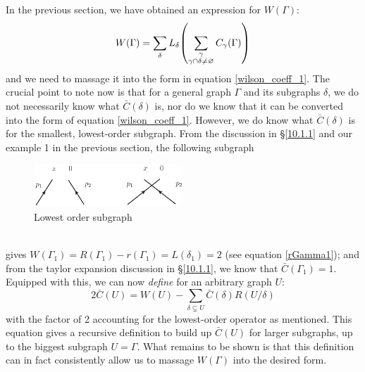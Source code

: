 \documentclass{article}
\begin{document}
In the previous section, we have obtained an expression for $W(\Gamma)$:
\begin{equation}
    W(\Gamma) = \sum_\delta L_\delta\qty(\sum_{\substack{\gamma \\ \gamma \cap \delta \neq \varnothing}}C_\gamma (\Gamma))
\end{equation}
and we need to massage it into the form in equation \ref{wilson_coeff_1}. The crucial point to note now is that for a general graph $\Gamma$ and its subgraphs $\delta$, we do not necessarily know what $\bar{C}(\delta)$ is, nor do we know that it can be converted into the form of equation \ref{wilson_coeff_1}. However, we do know what $\bar{C}(\delta)$ is for the smallest, lowest-order subgraph. From the discussion in \S\ref{10.1.1} and our example 1 in the previous section, the following subgraph
\begin{figure}[H]
\centering
\includegraphics*[width=0.5\textwidth]{Graphs/Fig1011a.eps}
\caption{Lowest order subgraph}
\end{figure}\\
gives $W(\Gamma_1) = R(\Gamma_1)-r(\Gamma_1) = L(\delta_1) = 2$ (see equation \ref{rGamma1}); and from the taylor expansion discussion in \S\ref{10.1.1}, we know that $\bar{C}(\Gamma_1)=1$. Equipped with this, we can now \textit{define} for an arbitrary graph $U$:
\begin{equation}
    2\bar{C}(U) = W(U) - \sum_{\delta \varsubsetneq U}\bar{C}(\delta)R(U/\delta)
\label{CbarU}
\end{equation}
with the factor of 2 accounting for the lowest-order operator as mentioned. This equation gives a recursive definition to build up $\bar{C}(U)$ for larger subgraphs, up to the biggest subgraph $U = \Gamma$. What remains to be shown is that this definition can in fact consistently allow us to massage $W(\Gamma)$ into the desired form. 
\end{document}
